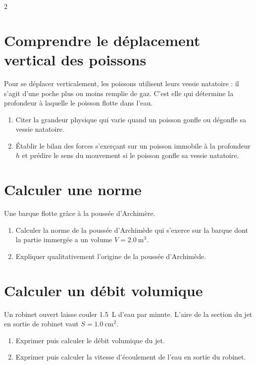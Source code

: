 \documentclass[a4paper,11pt,fleqn]{scrartcl}%
\begin{document}
	\maketitle
\begin{multicols}{2}
\section{Comprendre le déplacement vertical des poissons}
Pour se déplacer verticalement, les poissons utilisent leurs vessie natatoire : il s'agit d'une poche plus ou moins remplie de gaz. C'est elle qui détermine la profondeur à laquelle le poisson flotte dans l'eau.
\begin{enumerate}
	\item Citer la grandeur physique qui varie quand un poisson gonfle ou dégonfle sa vessie natatoire.
	\item Établir le bilan des forces s'exerçant sur un poisson immobile à la profondeur $h$ et prédire le sens du mouvement si le poisson gonfle sa vessie natatoire.
\end{enumerate}

\section{Calculer une norme}
Une barque flotte grâce à la poussée d'Archimère.
\begin{enumerate}
	\item Calculer la norme de la poussée d'Archimède qui s'exerce sur la barque dont la partie immergée a un volume $V=\SI{2,0}{\meter\cubed}$.
	\item Expliquer qualitativement l'origine de la poussée d'Archimède.
\end{enumerate}

\section{Calculer un débit volumique}
Un robinet ouvert laisse couler \SI{1,5}{L} d'eau par minute. L'aire de la section du jet en sortie de robinet vaut $S=\SI{1,0}{\centi\meter\squared}$.
\begin{enumerate}
	\item Exprimer puis calculer le débit volumique du jet.
	\item Exprimer puis calculer la vitesse d'écoulement de l'eau en sortie du robinet.
\end{enumerate}


\end{multicols}
\end{document}
